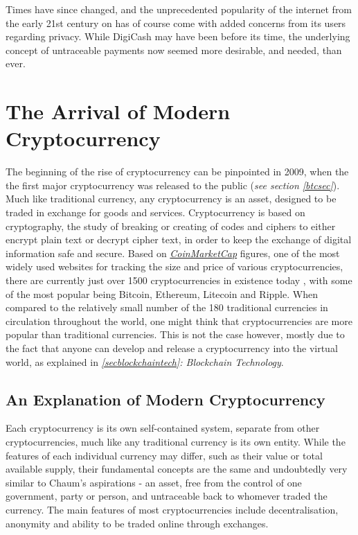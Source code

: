 Times have since changed, and the unprecedented popularity of the internet from the early 21st century on has of course come with added concerns from its users regarding privacy. While DigiCash may have been before its time, the underlying concept of untraceable payments now seemed more desirable, and needed, than ever. 

\section{The Arrival of Modern Cryptocurrency}
The beginning of the rise of cryptocurrency can be pinpointed in 2009, when the the first major cryptocurrency was released to the public (\textit{see section \ref{btcsec}}). Much like traditional currency, any cryptocurrency is an asset, designed to be traded in exchange for goods and services. Cryptocurrency is based on cryptography, the study of breaking or creating of codes and ciphers to either encrypt plain text or decrypt cipher text, in order to keep the exchange of digital information safe and secure. Based on \textcolor{NavyBlue}{\href{www.coinmarketcap.com}{\textit{CoinMarketCap}}} figures, one of the most widely used websites for tracking the size and price of various cryptocurrencies, there are currently just over 1500 cryptocurrencies in existence today \cite{coinmarketcap}, with some of the most popular being Bitcoin, Ethereum, Litecoin and Ripple. When compared to the relatively small number of the 180 traditional currencies in circulation throughout the world, one might think that cryptocurrencies are more popular than traditional currencies. This is not the case however, mostly due to the fact that anyone can develop and release a cryptocurrency into the virtual world, as explained in \textit{\ref{secblockchaintech}: Blockchain Technology}.

\subsection{An Explanation of Modern Cryptocurrency}\label{expmodern}

Each cryptocurrency is its own self-contained system, separate from other cryptocurrencies, much like any traditional currency is its own entity. While the features of each individual currency may differ, such as their value or total available supply, their fundamental concepts are the same and undoubtedly very similar to Chaum's aspirations - an asset, free from the control of one government, party or person, and untraceable back to whomever traded the currency. The main features of most cryptocurrencies include decentralisation, anonymity and ability to be traded online through exchanges.

